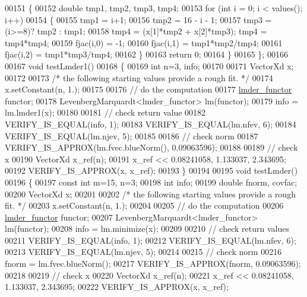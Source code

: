 \begin{DoxyCode}
00151 \textcolor{keyword}{    }\{
00152         \textcolor{keywordtype}{double} tmp1, tmp2, tmp3, tmp4;
00153         \textcolor{keywordflow}{for} (\textcolor{keywordtype}{int} i = 0; i < values(); i++)
00154         \{
00155             tmp1 = i+1;
00156             tmp2 = 16 - i - 1;
00157             tmp3 = (i>=8)? tmp2 : tmp1;
00158             tmp4 = (x[1]*tmp2 + x[2]*tmp3); tmp4 = tmp4*tmp4;
00159             fjac(i,0) = -1;
00160             fjac(i,1) = tmp1*tmp2/tmp4;
00161             fjac(i,2) = tmp1*tmp3/tmp4;
00162         \}
00163         \textcolor{keywordflow}{return} 0;
00164     \}
00165 \};
00166 
00167 \textcolor{keywordtype}{void} testLmder1()
00168 \{
00169   \textcolor{keywordtype}{int} n=3, info;
00170 
00171   VectorXd x;
00172 
00173   \textcolor{comment}{/* the following starting values provide a rough fit. */}
00174   x.setConstant(n, 1.);
00175 
00176   \textcolor{comment}{// do the computation}
00177   \hyperlink{structlmder__functor}{lmder\_functor} functor;
00178   LevenbergMarquardt<lmder\_functor> lm(functor);
00179   info = lm.lmder1(x);
00180 
00181   \textcolor{comment}{// check return value}
00182   VERIFY\_IS\_EQUAL(info, 1);
00183   VERIFY\_IS\_EQUAL(lm.nfev, 6);
00184   VERIFY\_IS\_EQUAL(lm.njev, 5);
00185 
00186   \textcolor{comment}{// check norm}
00187   VERIFY\_IS\_APPROX(lm.fvec.blueNorm(), 0.09063596);
00188 
00189   \textcolor{comment}{// check x}
00190   VectorXd x\_ref(n);
00191   x\_ref << 0.08241058, 1.133037, 2.343695;
00192   VERIFY\_IS\_APPROX(x, x\_ref);
00193 \}
00194 
00195 \textcolor{keywordtype}{void} testLmder()
00196 \{
00197   \textcolor{keyword}{const} \textcolor{keywordtype}{int} m=15, n=3;
00198   \textcolor{keywordtype}{int} info;
00199   \textcolor{keywordtype}{double} fnorm, covfac;
00200   VectorXd x;
00201 
00202   \textcolor{comment}{/* the following starting values provide a rough fit. */}
00203   x.setConstant(n, 1.);
00204 
00205   \textcolor{comment}{// do the computation}
00206   \hyperlink{structlmder__functor}{lmder\_functor} functor;
00207   LevenbergMarquardt<lmder\_functor> lm(functor);
00208   info = lm.minimize(x);
00209 
00210   \textcolor{comment}{// check return values}
00211   VERIFY\_IS\_EQUAL(info, 1);
00212   VERIFY\_IS\_EQUAL(lm.nfev, 6);
00213   VERIFY\_IS\_EQUAL(lm.njev, 5);
00214 
00215   \textcolor{comment}{// check norm}
00216   fnorm = lm.fvec.blueNorm();
00217   VERIFY\_IS\_APPROX(fnorm, 0.09063596);
00218 
00219   \textcolor{comment}{// check x}
00220   VectorXd x\_ref(n);
00221   x\_ref << 0.08241058, 1.133037, 2.343695;
00222   VERIFY\_IS\_APPROX(x, x\_ref);

\end{DoxyCode}
